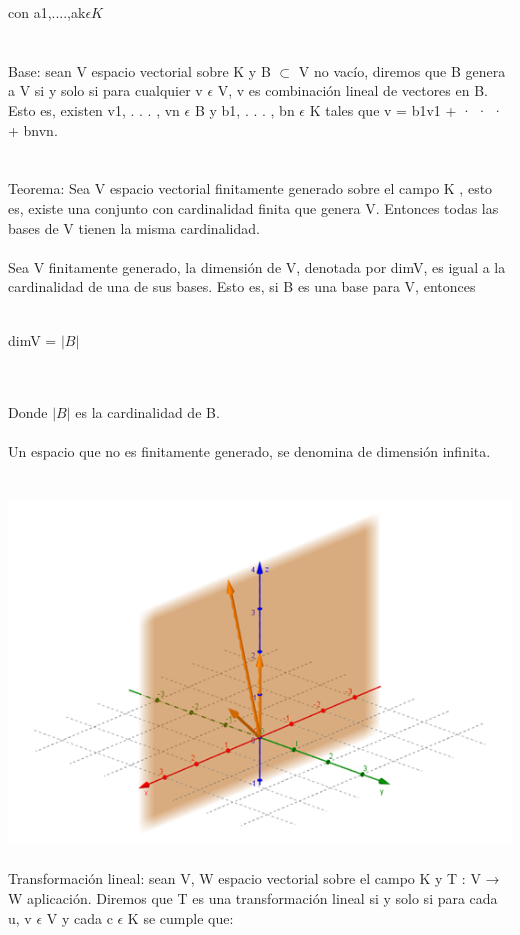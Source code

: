 \documentclass[a4paper,10pt]{article}
\begin{document}
con a1,....,ak$\epsilon K$\\\\\\
Base: sean V espacio vectorial sobre K y B $\subset $ V no vacío, diremos que B genera a V si y solo si para cualquier v $\epsilon$ V, v es combinación lineal de vectores en B. Esto es, existen v1, . . . , vn $\epsilon$ B y b1, . . . , bn $\epsilon$ K tales que v = b1v1 + · · · + bnvn.\\\\\\
Teorema: Sea V espacio vectorial finitamente generado sobre el campo K , esto es, existe una conjunto con cardinalidad finita que genera V. Entonces todas las bases de V tienen la misma cardinalidad.\\\\
Sea V finitamente generado, la dimensión de V, denotada por
dimV, es igual a la cardinalidad de una de sus bases. Esto es, si B
es una base para V, entonces\\\\
\centerline{ dimV = $|B|$}\\\\
Donde $|B|$ es la cardinalidad de B.\\\\
Un espacio que no es finitamente generado, se denomina de
dimensión infinita.\\\\\\
\includegraphics[scale=0.5]{base.png}\\\\
Transformación lineal: sean V, W espacio vectorial sobre el campo K y T : V → W aplicación. Diremos que T es una transformación lineal si y solo si para cada u, v $\epsilon$ V y cada c $\epsilon$ K se cumple que:\\\\
\end{document}

